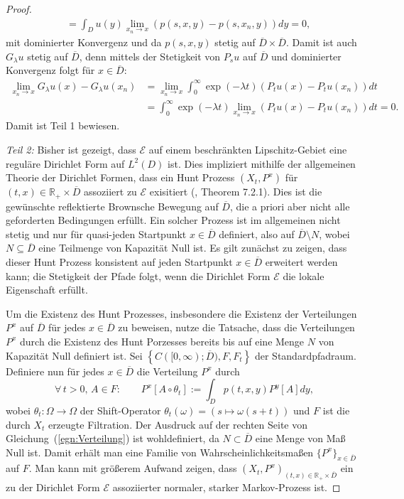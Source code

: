 \documentclass[10pt, a4paper, leqno, twoside, bibliography=totocnumbered, final]{scrartcl}
\theoremstyle{definition}
\theoremstyle{plain}%
\theoremstyle{remark}
\begin{document}
\begin{proof}
\begin{align*}
& =\int_D u(y) \lim_{x_n \to x} (p(s,x,y) - p(s,x_n,y)) dy = 0,
\end{align*}
mit dominierter Konvergenz und da $p(s,x,y)$ stetig auf $ \overline{D} \times \overline{D} $. Damit ist auch $ G_{\lambda}u $ stetig auf $ \overline{D} $, denn mittels der Stetigkeit von $ P_s u $ auf $ \overline{D} $ und dominierter Konvergenz folgt für $ x \in \overline{D} $:
\begin{align*}
\lim_{x_n \to x} G_{\lambda} u(x) - G_{\lambda} u(x_n) & = \lim_{x_n \to x} \int_0^{\infty} \exp(- \lambda t ) (P_t u(x) - P_t u(x_n)) dt \\
& = \int_0^{\infty} \exp(- \lambda t )  \lim_{x_n \to x} (P_t u(x) - P_t u(x_n)) dt = 0.
\end{align*}
Damit ist Teil 1 bewiesen.

\emph{Teil 2:} Bisher ist gezeigt, dass $ \mathcal{E} $ auf einem beschränkten Lipschitz-Gebiet eine reguläre Dirichlet Form auf $L^2(D)$ ist. Dies impliziert mithilfe der allgemeinen Theorie der Dirichlet Formen, dass ein Hunt Prozess $(X_t, P^x ) $ für $ (t,x) \in \mathbb{R}_+ \times \overline{D} $ assoziiert zu $ \mathcal{E} $ exisitiert (\cite{Fukushima}, Theorem 7.2.1). Dies ist die gewünschte reflektierte Brownsche Bewegung auf $ \overline{D} $, die a priori aber nicht alle geforderten Bedingungen erfüllt. Ein solcher Prozess ist im allgemeinen nicht stetig und nur für quasi-jeden Startpunkt $ x \in \overline{D} $  definiert, also auf $ \overline{D} \setminus N $, wobei $N \subseteq \overline{D}$ eine Teilmenge von Kapazität Null ist. Es gilt zunächst zu zeigen, dass dieser Hunt Prozess konsistent auf jeden Startpunkt $ x \in \overline{D} $ erweitert werden kann; die Stetigkeit der Pfade folgt, wenn die Dirichlet Form $ \mathcal{E} $ die lokale Eigenschaft erfüllt.

Um die Existenz des Hunt Prozesses, insbesondere die Existenz der Verteilungen $P^x$ auf $ \overline{D} $ für jedes $ x \in \overline{D} $ zu beweisen, nutze die Tatsache, dass die Verteilungen $P^x$ durch die Existenz des Hunt Porzesses bereits bis auf eine Menge $N$ von Kapazität Null definiert ist. Sei  $ \left\lbrace C([0, \infty); \overline{D}), F ,F_t \right\rbrace $ der Standardpfadraum. Definiere nun für jedes $ x \in \overline{D} $ die Verteilung $ P^x $ durch 
\begin{equation}
\label{egn:Verteilung}
\forall \, t >0 ,\, A \in F: \qquad P^x [A \circ \theta_t ] := \int_D p(t,x,y) P^y [A] dy,
\end{equation}
wobei $ \theta_t : \Omega \to \Omega $ der Shift-Operator $ \theta_t(\omega) = (s \mapsto \omega (s + t)) $ und $ F $ ist die durch $ X_t $ erzeugte Filtration. Der Ausdruck auf der rechten Seite von Gleichung~(\ref{egn:Verteilung}) ist wohldefiniert, da $N \subset \overline{D} $ eine Menge von Maß Null ist. Damit erhält man eine Familie von Wahrscheinlichkeitsmaßen $ \{P^x \}_{x \in \overline{D}} $ auf $ F $. Man kann mit größerem Aufwand zeigen, dass $ (X_t, P^x)_{(t,x) \in \mathbb{R}_+ \times \overline{D} } $ ein zu der Dirichlet Form $ \mathcal{E} $ assoziierter normaler, starker Markov-Prozess ist.


\end{proof}
\end{document}
